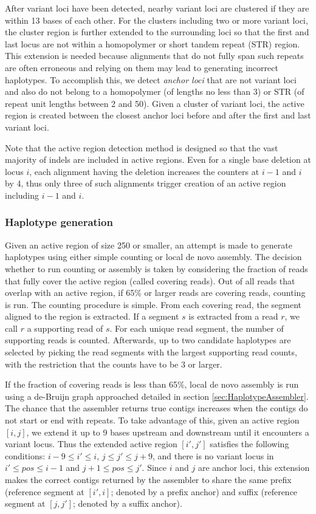 \documentclass{article}
\begin{document}
After variant loci have been detected, nearby variant loci are clustered if they are within 13 bases of each other. For the clusters including two or more variant loci, the cluster region is further extended to the surrounding loci so that the first and last locus are not within a homopolymer or short tandem repeat (STR) region. This extension is needed because alignments that do not fully span such repeats are often erroneous and relying on them may lead to generating incorrect haplotypes. To accomplish this, we detect {\em anchor loci} that are not variant loci and also do not belong to a homopolymer (of lengths no less than 3) or STR (of repeat unit lengths between 2 and 50). Given a cluster of variant loci, the active region is created between the closest anchor loci before and after the first and last variant loci.

Note that the active region detection method is designed so that the vast majority of indels are included in active regions. Even for a single base deletion at locus $i$, each alignment having the deletion increases the counters at $i-1$ and $i$ by 4, thus only three of such alignments trigger creation of an active region including $i-1$ and $i$.


\subsubsection{Haplotype generation}
Given an active region of size 250 or smaller, an attempt is made to generate haplotypes using either simple counting or local de novo assembly. The decision whether to run counting or assembly is taken by considering the fraction of reads that fully cover the active region (called covering reads). Out of all reads that overlap with an active region, if 65\% or larger reads are covering reads, counting is run. The counting procedure is simple. From each covering read, the segment aligned to the region is extracted. If a segment $s$ is extracted from a read $r$, we call $r$ a supporting read of $s$. For each unique read segment, the number of supporting reads is counted. Afterwards, up to two candidate haplotypes are selected by picking the read segments with the largest supporting read counts, with the restriction that the counts have to be 3 or larger.

If the fraction of covering reads is less than 65\%, local de novo assembly is run using a de-Bruijn graph approached detailed in section \ref{sec:HaplotypeAssembler}. The chance that the assembler returns true contigs increases when the contigs do not start or end with repeats. To take advantage of this, given an active region $[i,j]$, we extend it up to 9 bases upstream and downstream until it encounters a variant locus. Thus the extended active region $[i',j']$ satisfies the following conditions: $i-9 \leq i' \leq i$, $j \leq j' \leq j+9$, and there is no variant locus in $i' \leq pos \leq i-1$ and $j+1 \leq pos \leq j'$. Since $i$ and $j$ are anchor loci, this extension makes the correct contigs returned by the assembler to share the same prefix (reference segment at $[i',i]$; denoted by a prefix anchor) and suffix (reference segment at $[j,j']$; denoted by a suffix anchor).
\end{document}
